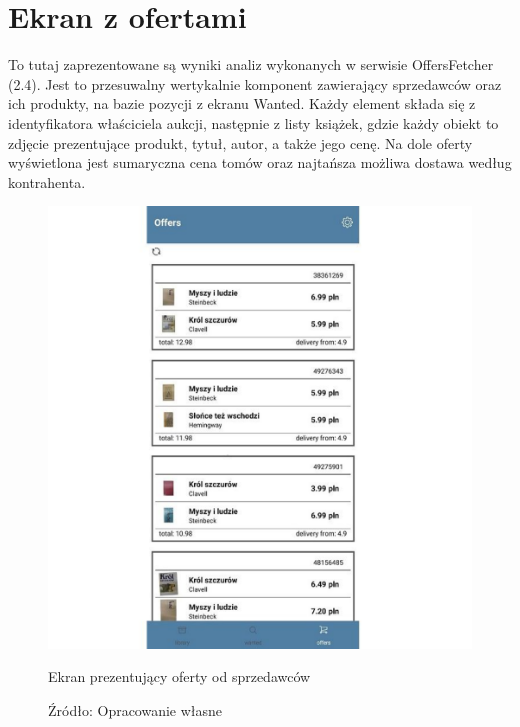 \section{Ekran z ofertami}
To tutaj zaprezentowane są wyniki analiz wykonanych w serwisie OffersFetcher (2.4). Jest to przesuwalny wertykalnie komponent zawierający sprzedawców oraz ich produkty, na bazie pozycji z ekranu Wanted. Każdy element składa się z identyfikatora właściciela aukcji, następnie z listy książek, gdzie każdy obiekt to zdjęcie prezentujące produkt, tytuł, autor, a także jego cenę. Na dole oferty wyświetlona jest sumaryczna cena tomów oraz najtańsza możliwa dostawa według kontrahenta.
\begin{figure}[H]
	\centering
	\includegraphics[width=\linewidth]{offers.pdf}
	\caption{\centering Ekran prezentujący oferty od sprzedawców}
	\caption*{\centering Źródło: {Opracowanie własne}}
\end{figure}

\newpage

